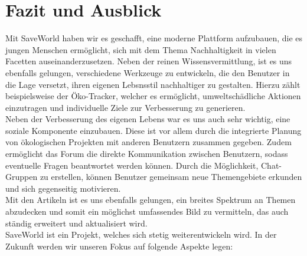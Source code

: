 \documentclass[../main.tex]{subfiles}
\begin{document}
    \chapter{Fazit und Ausblick}
    Mit SaveWorld haben wir es geschafft, eine moderne Plattform aufzubauen, die es jungen Menschen ermöglicht, sich mit dem Thema Nachhaltigkeit in vielen Facetten auseinanderzusetzen.
    Neben der reinen Wissensvermittlung, ist es uns ebenfalls gelungen, verschiedene Werkzeuge zu entwickeln, die den Benutzer in die Lage versetzt, ihren eigenen Lebsnsstil nachhaltiger zu gestalten.
    Hierzu zählt beispielsweise der Öko-Tracker, welcher es ermöglicht, umweltschädliche Aktionen einzutragen und individuelle Ziele zur Verbesserung zu generieren.
    \\
    Neben der Verbesserung des eigenen Lebens war es uns auch sehr wichtig, eine soziale Komponente einzubauen.
    Diese ist vor allem durch die integrierte Planung von ökologischen Projekten mit anderen Benutzern zusammen gegeben.
    Zudem ermöglicht das Forum die direkte Kommunikation zwischen Benutzern, sodass eventuelle Fragen beantwortet werden können.
    Durch die Möglichkeit, Chat-Gruppen zu erstellen, können Benutzer gemeinsam neue Themengebiete erkunden und sich gegenseitig motivieren.
    \\
    Mit den Artikeln ist es uns ebenfalls gelungen, ein breites Spektrum an Themen abzudecken und somit ein möglichst umfassendes Bild zu vermitteln, das auch ständig erweitert und aktualisiert wird.
    \\
    SaveWorld ist ein Projekt, welches sich stetig weiterentwickeln wird.
    In der Zukunft werden wir unseren Fokus auf folgende Aspekte legen:
\end{document}
